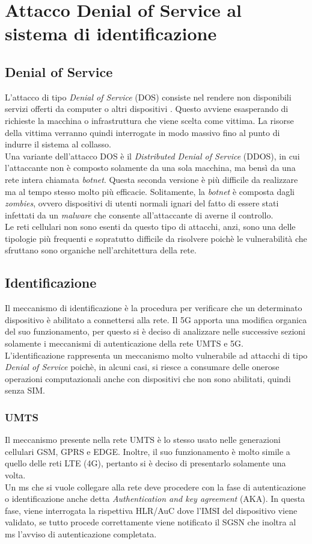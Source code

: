 \section{Attacco Denial of Service al sistema di identificazione}
\subsection{Denial of Service}
L'attacco di tipo \textit{Denial of Service} (DOS) consiste nel rendere non disponibili servizi offerti da computer o altri
dispositivi \cite{dos-definition}. Questo avviene esasperando di richieste la macchina o infrastruttura che viene scelta come
vittima. La risorse della vittima verranno quindi interrogate in modo massivo fino al punto di indurre il sistema al collasso.\\
Una variante dell'attacco DOS è il \textit{Distributed Denial of Service} (DDOS), in cui l'attaccante non è composto solamente da una sola
macchina, ma bensì da una rete intera chiamata \textit{botnet}. Questa seconda versione è più difficile da realizzare ma al tempo stesso
molto più efficacie. Solitamente, la \textit{botnet} è composta dagli \textit{zombies}, ovvero dispositivi di utenti normali ignari del fatto 
di essere stati infettati da un \textit{malware} che consente all'attaccante di averne il controllo.\\
Le reti cellulari non sono esenti da questo tipo di attacchi, anzi, sono una delle tipologie più frequenti e sopratutto difficile da risolvere
poichè le vulnerabilità che sfruttano sono organiche nell'architettura della rete.

\subsection{Identificazione}
Il meccanismo di identificazione è la procedura per verificare che un determinato dispositivo
è abilitato a connettersi alla rete. Il 5G apporta una modifica organica del suo funzionamento, per
questo si è deciso di analizzare nelle successive sezioni solamente i meccanismi di autenticazione della rete
UMTS e 5G.\\
L'identificazione rappresenta un meccanismo molto vulnerabile ad attacchi di tipo \textit{Denial of Service} poichè, 
in alcuni casi, si riesce a consumare delle onerose operazioni computazionali anche con dispositivi che non sono abilitati,
quindi senza SIM.
\subsubsection{UMTS}
Il meccanismo presente nella rete UMTS è lo stesso usato nelle generazioni cellulari GSM, GPRS e EDGE. Inoltre, il 
suo funzionamento è molto simile a quello delle reti LTE (4G), pertanto si è deciso di presentarlo solamente una volta.\\
Un \acrshort{ms} che si vuole collegare alla rete deve procedere con la fase di autenticazione o identificazione anche detta \textit{Authentication and key agreement}
(AKA). In questa fase, viene interrogata la rispettiva HLR/AuC dove l'IMSI del dispositivo viene validato, se tutto procede correttamente
viene notificato il SGSN che inoltra al \acrshort{ms} l'avviso di autenticazione completata.

